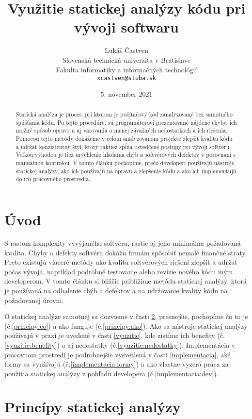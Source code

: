 \documentclass[11pt,twoside,slovak,a4paper]{article}
\title{Využitie statickej analýzy kódu pri vývoji softwaru}
\author{Lukáš Častven\\[2pt]
	{\small Slovenská technická univerzita v Bratislave}\\
	{\small Fakulta informatiky a informačných technológií}\\
	{\small \texttt{xcastven@stuba.sk}}
	}
\date{\small  5. november 2021}
\begin{document}
\maketitle

\begin{abstract}
	Statická analýza je proces, pri ktorom je počítačový kód zanalyzovaný bez samotného spúšťania kódu.
	Po tejto procedúre, sú programátorovi prezentované nájdené chyby, ich možný spôsob opravy a aj varovania
	o menej závažných nedostatkoch a ich riešenia. Pomocou tejto metódy dokážeme v celom analyzovanom projekte
	zlepšiť kvalitu kódu a udržať konzistentný štýl, ktorý taktiež spĺňa osvedčené postupy pri vývoji softvéru.
	Veľkou výhodou je tiež urýchlenie hľadania chýb a softvérových defektov v porovnaní s manuálnou kontrolou.
	V tomto článku pochopíme, prečo developeri používajú nástroje statickej analýzy, ako ich používajú
	na opravu a zlepšenie kódu a ako ich implementujú do ich pracovného prostredia.
\end{abstract}

\pagestyle{plain}

\section{Úvod}
S rastom komplexity vyvýjaného softvéru, rastie aj jeho minimálna požadovaná kvalita. Chyby a defekty softvéru
dokážu firmám spôsobiť nemalé finančné straty. Preto existujú viaceré metódy ako kvalitu softvérových riešení zlepšiť
a udržať počas vývoja, napríklad podrobné testovanie alebo revízie nového kódu iným developerom. V tomto článku si
bližšie priblížime metódu statickej analýzy, ktorá je používaná na odhalenie chýb a defektov a na udržovanie kvality kódu na požadovanej
úrovni.~\cite{BrittanyJohnson,LisaNguyen}

O statickej analýze samotnej sa dozvieme v časti \ref{principy}, presnejšie, pochopíme čo to je (č.\ref{principy:co}) a
ako funguje (č.\ref{principy:ako}). Ako sa nástroje statickej analýzy používajú v praxi je uvedené v časti \ref{vyuzitie}, kde
zistíme ich benefity (č.\ref{vyuzitie:benefity}) a aj nedostatky (č.\ref{vyuzitie:nedostatky}). Implementácia v pracovnom prostredí
je podrobnejšie vysvetlená v časti \ref{implementacia}, aké formy sa využívajú (č.\ref{implementacia:formy}) a ako vlastne vyzerá
práca za použitia statickej analýzy z pohľadu developera (č.\ref{implementacia:dev}).



\section{Princípy statickej analýzy} \label{principy}
\end{document}
